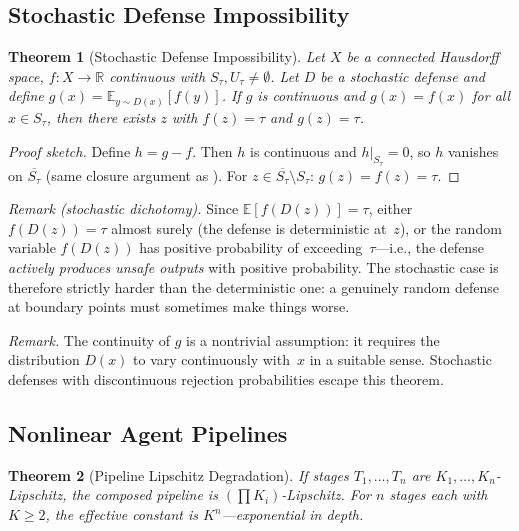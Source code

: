 \documentclass[11pt]{article}
\newtheorem{theorem}{Theorem}[section]
\newcommand{\R}{\mathbb{R}}
\newcommand{\cl}[1]{\overline{#1}}
\begin{document}
\subsection{Stochastic Defense Impossibility}

\begin{theorem}[Stochastic Defense Impossibility]
\label{thm:stochastic}
Let $X$ be a connected Hausdorff space, $f\colon X \to \R$ continuous
with $S_\tau, U_\tau \neq \emptyset$. Let $D$ be a stochastic defense
and define $g(x) = \mathbb{E}_{y \sim D(x)}[f(y)]$. If $g$ is
continuous and $g(x) = f(x)$ for all $x \in S_\tau$, then there
exists $z$ with $f(z) = \tau$ and $g(z) = \tau$.
\end{theorem}

\begin{proof}[Proof sketch]
Define $h = g - f$. Then $h$ is continuous and $h|_{S_\tau} = 0$,
so $h$ vanishes on $\cl{S_\tau}$ (same closure argument as
). For
$z \in \cl{S_\tau} \setminus S_\tau$: $g(z) = f(z) = \tau$.
\end{proof}

\noindent\textit{Remark (stochastic dichotomy).}
Since $\mathbb{E}[f(D(z))] = \tau$, either $f(D(z)) = \tau$ almost
surely (the defense is deterministic at~$z$), or the random variable
$f(D(z))$ has positive probability of exceeding~$\tau$---i.e., the
defense \emph{actively produces unsafe outputs} with positive
probability. The stochastic case is therefore strictly harder than
the deterministic one: a genuinely random defense at boundary points
must sometimes make things worse.

\noindent\textit{Remark.}
The continuity of $g$ is a nontrivial assumption: it requires the
distribution $D(x)$ to vary continuously with~$x$ in a suitable sense.
Stochastic defenses with discontinuous rejection probabilities escape
this theorem.

\subsection{Nonlinear Agent Pipelines}

\begin{theorem}[Pipeline Lipschitz Degradation]
\label{thm:pipeline}
If stages $T_1, \ldots, T_n$ are $K_1, \ldots, K_n$-Lipschitz, the
composed pipeline is $(\prod K_i)$-Lipschitz. For $n$ stages each with
$K \geq 2$, the effective constant is $K^n$---exponential in depth.
\end{theorem}
\end{document}
